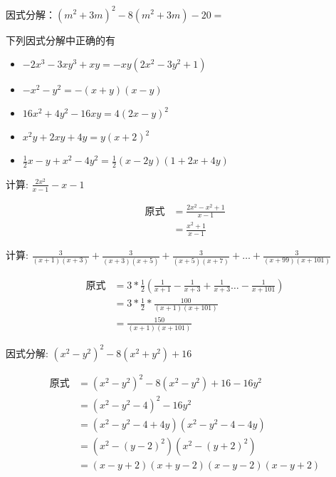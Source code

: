 \documentclass[answers]{exam} %
\begin{document}
\begin{questions}
\question
  因式分解：$(m^2 + 3m)^2 - 8(m^2 + 3m) - 20=$\fillin[$(m-2)(m+2)(m-1)(m+5)$]

\question
  下列因式分解中正确的有
  \begin{itemize}
  \item $-2x^3-3xy^3+xy=-xy(2x^2-3y^2+1)$
  \item $-x^2 - y^2 = -(x+y)(x-y)$
  \item $16x^2 + 4y^2 - 16xy = 4(2x - y)^2$
  \item $x^2y + 2xy + 4y = y(x + 2)^2$
  \item $\frac{1}{2}x - y + x^2 - 4y^2 = \frac{1}{2}(x - 2y)(1 + 2x + 4y)$
  \end{itemize}

  \begin{oneparchoices}
       
  \end{oneparchoices}

\question
  计算: $\frac{2x^2}{x - 1} - x - 1$

  \vspace*{1in}
  \begin{solution}
    \[
      \begin{aligned}
        \mbox{原式} &= \frac{2x^2 - x^2 + 1}{x - 1} \\
        &= \frac{x^2 + 1}{x - 1}
      \end{aligned}
    \]
  \end{solution}

\question
  计算:
  $\frac{3}{(x + 1)(x + 3)} + \frac{3}{(x + 3)(x + 5)}
  + \frac{3}{(x + 5)(x + 7)} + \dots + \frac{3}{(x + 99)(x + 101)}
  $

  \vspace*{1in}
  \begin{solution}
    \[
      \begin{aligned}
        \mbox{原式} &= 3 * \frac{1}{2} ( \frac{1}{x + 1} - \frac{1}{x + 3} + \frac{1}{x + 3} \dots - \frac{1}{x + 101}) \\
        &= 3 * \frac{1}{2} * \frac{100}{(x + 1)(x + 101)} \\
        &= \frac{150}{(x + 1)(x + 101)}
      \end{aligned}
    \]
  \end{solution}

\question
  因式分解: $(x^2 - y^2)^2 - 8(x^2 + y^2) + 16$

  \vspace*{1in}
  \begin{solution}
    \[
      \begin{aligned}
        \mbox{原式} &= (x^2 - y^2)^2 - 8(x^2 - y^2) + 16 - 16 y^2 \\
        &= (x^2 - y^2 - 4)^2 - 16y^2 \\
        &= (x^2 - y^2 - 4 + 4y)(x^2 - y^2 - 4 - 4y) \\
        &= (x^2 - (y - 2)^2)(x^2 - (y + 2)^2) \\
        &= (x - y + 2)(x + y - 2)(x - y - 2)(x - y + 2)
      \end{aligned}
    \]
  \end{solution}


\end{questions}
\end{document}
